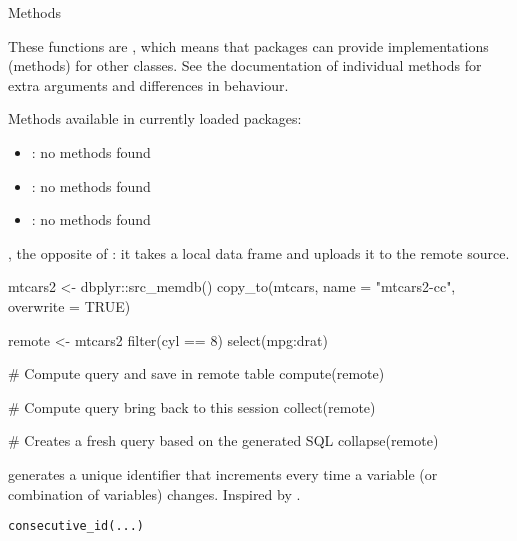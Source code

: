 \documentclass[a4paper]{book}
\begin{document}
%
\begin{Section}{Methods}

These functions are , which means that packages can provide
implementations (methods) for other classes. See the documentation of
individual methods for extra arguments and differences in behaviour.

Methods available in currently loaded packages:
\begin{itemize}

\item{} : no methods found
\item{} : no methods found
\item{} : no methods found

\end{itemize}

\end{Section}
%
\begin{SeeAlso}
, the opposite of : it takes a local data
frame and uploads it to the remote source.
\end{SeeAlso}
%
\begin{Examples}
\begin{ExampleCode}

mtcars2 <- dbplyr::src_memdb() %
  copy_to(mtcars, name = "mtcars2-cc", overwrite = TRUE)

remote <- mtcars2 %
  filter(cyl == 8) %
  select(mpg:drat)

# Compute query and save in remote table
compute(remote)

# Compute query bring back to this session
collect(remote)

# Creates a fresh query based on the generated SQL
collapse(remote)

\end{ExampleCode}
\end{Examples}
%
\begin{Description}
 generates a unique identifier that increments every time
a variable (or combination of variables) changes. Inspired by
.
\end{Description}
%
\begin{Usage}
\begin{verbatim}
consecutive_id(...)
\end{verbatim}
\end{Usage}
\end{document}
